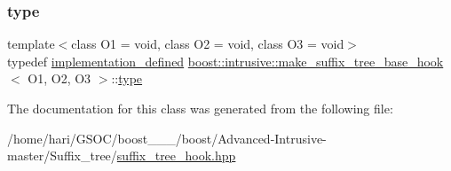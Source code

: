 \mbox{\label{classboost_1_1intrusive_1_1make__suffix__tree__base__hook_a72474fe783f53cf3da5ff706894eefd6}} 
\subsubsection{\texorpdfstring{type}{type}}
{\footnotesize\ttfamily template$<$class O1 = void, class O2 = void, class O3 = void$>$ \\
typedef \hyperlink{classboost_1_1intrusive_1_1make__suffix__tree__base__hook_a21cb881040ae75027aaa684f98669d45}{implementation\+\_\+defined} \hyperlink{classboost_1_1intrusive_1_1make__suffix__tree__base__hook}{boost\+::intrusive\+::make\+\_\+suffix\+\_\+tree\+\_\+base\+\_\+hook}$<$ O1, O2, O3 $>$\+::\hyperlink{classboost_1_1intrusive_1_1make__suffix__tree__base__hook_a72474fe783f53cf3da5ff706894eefd6}{type}}



The documentation for this class was generated from the following file\+:\begin{DoxyCompactItemize}
\item 
/home/hari/\+G\+S\+O\+C/boost\+\_\+\_\+\_/boost/\+Advanced-\/\+Intrusive-\/master/\+Suffix\+\_\+tree/\hyperlink{suffix__tree__hook_8hpp}{suffix\+\_\+tree\+\_\+hook.\+hpp}\end{DoxyCompactItemize}
